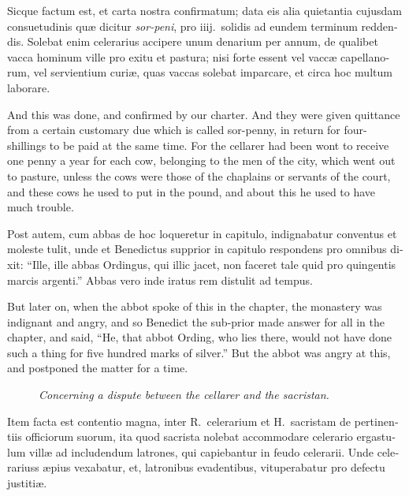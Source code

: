 \documentclass[10pt]{book}
\newcommand{\blockhead}[4][]{
\begin{figure}
\centering
\vspace{#4}
\parbox{2.75cm}{\begin{center}\footnotesize \color{BrickRed} \emph{#2}\\ #1 \end{center}}
\end{figure}
}
\begin{document}
\begin{paracol}{2}
\switchcolumn*

\begin{otherlanguage}{latin}
Sicque factum est, et carta nostra confirmatum; data eis alia quietantia cujusdam consuetudinis qu\ae{} dicitur \emph{sor-peni}, pro iiij.\ solidis ad eundem terminum reddendis. Solebat enim celerarius accipere unum denarium per annum, de qualibet vacca hominum ville pro exitu et pastura; nisi forte essent vel vacc\ae{} capellanorum, vel servientium curi\ae{}, quas vaccas solebat imparcare, et circa hoc multum laborare. 
\end{otherlanguage}

\switchcolumn

And this was done, and confirmed by our charter. And they were given quittance from a certain customary due which is called sor-penny, in return for four-shillings to be paid at the same time. For the cellarer had been wont to receive one penny a year for each cow, belonging to the men of the city, which went out to pasture, unless the cows were those of the chaplains or servants of the court, and these cows he used to put in the pound, and about this he used to have much trouble.

\switchcolumn*

\begin{otherlanguage}{latin}
Post autem, cum abbas de hoc loqueretur in capitulo, indignabatur conventus et moleste tulit, unde et Benedictus supprior in capitulo respondens pro omnibus dixit: ``Ille, ille abbas Ordingus, qui illic jacet, non faceret tale quid pro quingentis marcis argenti.'' Abbas vero inde iratus rem distulit ad tempus. 
\end{otherlanguage}

\switchcolumn

But later on, when the abbot spoke of this in the chapter, the monastery was indignant and angry, and so Benedict the sub-prior made answer for all in the chapter, and said, ``He, that abbot Ording, who lies there, would not have done such a thing for five hundred marks of silver.'' But the abbot was angry at this, and postponed the matter for a time.

\switchcolumn*

\begin{otherlanguage}{latin}
\blockhead{Concerning a dispute between the cellarer and the sacristan.}{4}{-.5cm}
Item facta est contentio magna, inter R.\ celerarium et H.\ sacristam de pertinentiis officiorum suorum, ita quod sacrista nolebat accommodare celerario ergastulum vill\ae{} ad includendum latrones, qui capiebantur in feudo celerarii. Unde celerariuss \ae{}pius vexabatur, et, latronibus evadentibus, vituperabatur pro defectu justiti\ae{}.


\end{otherlanguage}
\end{paracol}
\end{document}

